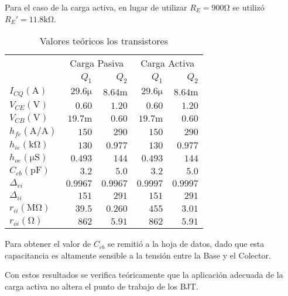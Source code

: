 \newpage
{}

Para el caso de la carga activa, en lugar de utilizar $R_E = 900\si{\ohm}$ se utilizó $R_E' = 11.8 \si{\kilo\ohm}$.

\begin{table}[ht]
    \centering
    \begin{tabular}{|l|r|r|r|r|}
        \hline
        \multirow{2}{*}{} & \multicolumn{2}{c|}{Carga Pasiva} & \multicolumn{2}{c|}{Carga Activa} \\ \cline{2-5} 
         & $Q_1$ & $Q_2$ & $Q_1$ & $Q_2$ \\ \hline

        $I_{CQ} (\si{\ampere})$ & $29.6 \si{\micro}$& $8.64\si{\milli}$ & $29.6 \si{\micro}$& $8.64\si{\milli}$\\
        $V_{CE} (\si{\volt})$   & $0.60$            & $1.20$ & $0.60$ & $1.20$ \\
        $V_{CB} (\si{\volt})$   & $19.7 \si{\milli}$& $0.60$ & $19.7 \si{\milli}$& $0.60$\\ \hline

        $h_{fe} (\si{\ampere}/\si{\ampere})$ & $150$ & $290$ & $150$ & $290$ \\
        $h_{ie} (\si{\kilo\ohm})$ & $130$ & $0.977$ & $130$ & $0.977$ \\
        $h_{oe} (\si{\micro\siemens})$ & $0.493$ & $144$ & $0.493$ & $144$ \\
        $C_{cb} (\si{\pico\farad})$ & $3.2$ & $5.0$ & $3.2$ & $5.0$ \\ \hline

        $\Delta_{vi}$ & $0.9967$ & $0.9967$ & $0.9997$ & $0.9997$ \\
        $\Delta_{ii}$ & $151$ & $291$ & $151$ & $291$ \\
        $r_{ii} (\si{\mega\ohm})$ & $39.5$ & $0.260$ & $455$ & $3.01$ \\ 
        $r_{oi} (\si{\ohm})$ & $862$ & $5.91$ & $862$ & $5.91$ \\ \hline
    \end{tabular}
    \caption{Valores teóricos los transistores}
    \label{tab:vals_teo}
\end{table}

Para obtener el valor de $C_{cb}$ se remitió a la hoja de datos, dado que esta capacitancia es altamente sensible a la tensión entre la Base y el Colector.

Con estos resultados se verifica teóricamente que la aplicación adecuada de la carga activa no altera el punto de trabajo de los BJT.

